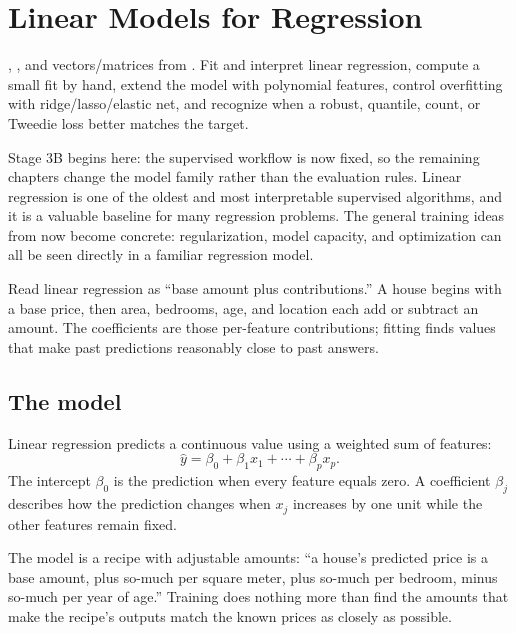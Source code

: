\chapter{Linear Models for Regression}
\label{ch:regression}

\chapterguide%
  {, , and vectors/matrices from .}
  {Fit and interpret linear regression, compute a small fit by hand, extend the model with polynomial features, control overfitting with ridge/lasso/elastic net, and recognize when a robust, quantile, count, or Tweedie loss better matches the target.}

Stage 3B begins here: the supervised workflow is now fixed, so the remaining chapters change the model family rather than the evaluation rules. Linear regression is one of the oldest and most interpretable supervised algorithms, and it is a valuable baseline for many regression problems. The general training ideas from  now become concrete: regularization, model capacity, and optimization can all be seen directly in a familiar regression model.

\begin{firstread}
Read linear regression as ``base amount plus contributions.'' A house begins with a base price, then area, bedrooms, age, and location each add or subtract an amount. The coefficients are those per-feature contributions; fitting finds values that make past predictions reasonably close to past answers.
\end{firstread}

\section{The model}

Linear regression predicts a continuous value using a weighted sum of features:
\[
  \hat{y}=\beta_0+\beta_1x_1+\cdots+\beta_{p}x_{p}.
\]
The intercept $\beta_0$ is the prediction when every feature equals zero. A coefficient $\beta_j$ describes how the prediction changes when $x_j$ increases by one unit while the other features remain fixed.

\begin{intuition}
The model is a recipe with adjustable amounts: ``a house's predicted price is a base amount, plus so-much per square meter, plus so-much per bedroom, minus so-much per year of age.'' Training does nothing more than find the amounts that make the recipe's outputs match the known prices as closely as possible.
\end{intuition}

